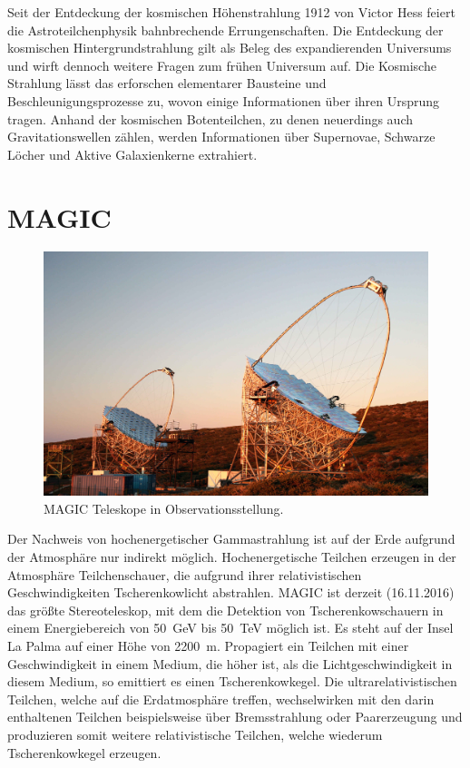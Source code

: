 Seit der Entdeckung der kosmischen Höhenstrahlung
1912 von Victor Hess feiert die Astroteilchenphysik bahnbrechende Errungenschaften.
Die Entdeckung der kosmischen Hintergrundstrahlung gilt als Beleg des
expandierenden Universums und wirft dennoch weitere Fragen zum frühen Universum auf.
Die Kosmische Strahlung lässt das erforschen elementarer Bausteine und
Beschleunigungsprozesse zu,
wovon einige Informationen über ihren Ursprung tragen.
Anhand der kosmischen Botenteilchen, zu denen neuerdings auch Gravitationswellen
zählen, werden Informationen über Supernovae, Schwarze Löcher und Aktive
Galaxienkerne extrahiert.

\section*{MAGIC}%
\label{sec:magic}

\begin{figure}
		\includegraphics[width=\linewidth]{pictures/magic.JPG}
		\caption{MAGIC Teleskope in Observationsstellung.}%
		\label{fig:magic}
\end{figure}

Der Nachweis von hochenergetischer Gammastrahlung ist auf der Erde aufgrund der
Atmosphäre nur indirekt möglich.
Hochenergetische Teilchen erzeugen in der Atmosphäre Teilchenschauer, die
aufgrund ihrer relativistischen Geschwindigkeiten Tscherenkowlicht abstrahlen.
MAGIC ist derzeit (16.11.2016) das größte Stereoteleskop, mit dem die
Detektion von Tscherenkowschauern in einem Energiebereich von
\SI{50}{\giga\electronvolt} bis \SI{50}{\tera\electronvolt} möglich ist.
Es steht auf der Insel La Palma auf einer Höhe von \SI{2200}{\meter}.
Propagiert ein Teilchen mit einer Geschwindigkeit in einem Medium, die höher
ist, als die Lichtgeschwindigkeit in diesem Medium, so emittiert
es einen Tscherenkowkegel.
Die ultrarelativistischen Teilchen, welche auf die Erdatmosphäre treffen,
wechselwirken mit den darin enthaltenen Teilchen beispielsweise über
Bremsstrahlung oder Paarerzeugung und produzieren somit weitere
relativistische Teilchen, welche wiederum Tscherenkowkegel erzeugen.

